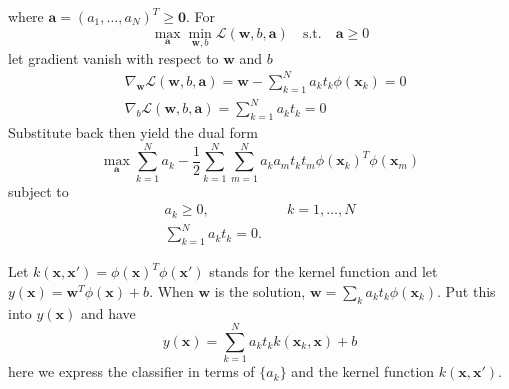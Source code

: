 \documentclass{article}
\begin{document}
        where $\mathbf{a}=(a_1,\dots,a_N)^T\geq \mathbf{0}$. For
        \[
            \max_{\mathbf{a}}\min_{\mathbf{w},b}\mathcal{L}(\mathbf{w},b,\mathbf{a})\mathrm{\quad s.t. \quad}\mathbf{a}\geq 0
        \]
        let gradient vanish with respect to $\mathbf{w}$ and $b$
        \begin{align*}
            &\nabla_{\mathbf{w}}\mathcal{L}(\mathbf{w},b,\mathbf{a}) = \mathbf{w}-\sum_{k=1}^N a_k t_k \phi(\mathbf{x}_k) = 0\\
            &\nabla_b \mathcal{L}(\mathbf{w},b,\mathbf{a}) = \sum_{k=1}^N a_kt_k = 0
        \end{align*}
        Substitute back then yield the dual form
        \[
            \max_{\mathbf{a}}\sum_{k=1}^N a_k - \frac{1}{2} \sum_{k=1}^N \sum_{m=1}^N a_k a_m t_k t_m \phi(\mathbf{x}_k)^T \phi(\mathbf{x}_m)
        \]
        subject to
        \begin{align*}
            a_k \geq 0,&\quad k=1,\dots,N\\
            \sum_{k=1}^N a_k t_k = 0.&
        \end{align*}
        
        Let $k(\mathbf{x},\mathbf{x}')=\phi(\mathbf{x})^T \phi(\mathbf{x}')$ stands for the kernel function and let $y(\mathbf{x}) = \mathbf{w}^T \phi(\mathbf{x}) + b$. When $\mathbf{w}$ is the solution, $\mathbf{w} = \sum_k a_k t_k \phi(\mathbf{x}_k)$. Put this into $y(\mathbf{x})$ and have
        \[
            y(\mathbf{x}) = \sum_{k=1}^N a_k t_k k(\mathbf{x}_k, \mathbf{x}) + b
        \]
        here we express the classifier in terms of $\{a_k\}$ and the kernel function $k(\mathbf{x}, \mathbf{x}')$.
        
\end{document}
